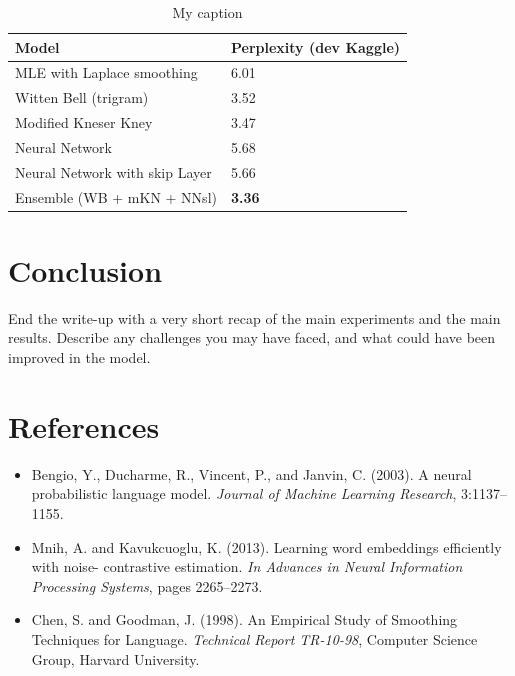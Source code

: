 \documentclass[11pt]{article}
\begin{document}
\begin{table}[]
\centering
\caption{My caption}
\label{my-label}
\begin{tabular}{|l|l|}
\hline
Model                          & Perplexity (dev Kaggle) \\ \hline
MLE with Laplace smoothing     & 6.01                    \\ \hline
Witten Bell (trigram)          & 3.52                    \\ \hline
Modified Kneser Kney           & 3.47                    \\ \hline
Neural Network                 & 5.68                    \\ \hline
Neural Network with skip Layer & 5.66                    \\ \hline
Ensemble (WB + mKN + NNsl)     & \textbf{3.36}                    \\ \hline
\end{tabular}
\end{table}


\section{Conclusion}

End the write-up with a very short recap of the main experiments and the main results. Describe any challenges you may have faced, and what could have been improved in the model.

\section{References}
\begin{itemize}
\item Bengio, Y., Ducharme, R., Vincent, P., and Janvin, C. (2003). A neural probabilistic language model. \emph{Journal of Machine Learning Research}, 3:1137–1155.

\item Mnih, A. and Kavukcuoglu, K. (2013). Learning word embeddings efficiently with noise- contrastive estimation. \emph{In Advances in Neural Information Processing Systems}, pages 2265–2273.

\item Chen, S. and Goodman, J. (1998). An Empirical Study of Smoothing Techniques for Language. \emph{Technical Report TR-10-98}, Computer Science Group, Harvard University.
\end{itemize}
\end{document}
